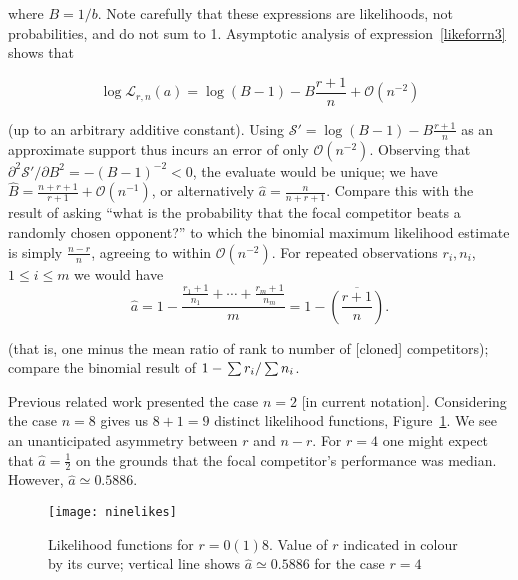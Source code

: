 \documentclass[article]{ajs}
\begin{document}
\noindent where $B=1/b$.  Note carefully that these expressions are
likelihoods, not probabilities, and do not sum to 1.  Asymptotic
analysis of expression~\ref{likeforrn3} shows that

\begin{equation}\label{asymptotic}
\log\mathcal{L}_{r,n}(a)=\log(B-1)-B\frac{r+1}{n}
+\mathcal{O}\left(n^{-2}\right)
\end{equation}

(up to an arbitrary additive constant).  Using
$\mathcal{S}'=\log(B-1)-B\frac{r+1}{n}$ as an approximate support thus
incurs an error of only $\mathcal{O}(n^{-2})$.  Observing that
$\partial^2\mathcal{S'}/\partial B^2=-(B-1)^{-2}<0$, the evaluate
would be unique; we have
$\hat{B}=\frac{n+r+1}{r+1}+\mathcal{O}\left(n^{-1}\right)$, or
alternatively $\hat{a}=\frac{n}{n+r+1}$.  Compare this with the result
of asking ``what is the probability that the focal competitor
beats a randomly chosen opponent?'' to which the binomial maximum
likelihood estimate is simply $\frac{n-r}{n}$, agreeing to within
$\mathcal{O}(n^{-2})$.  For repeated observations $r_i,n_i$,
$1\leqslant i\leqslant m$ we would have
\begin{equation}
  \hat{a} = 1-
  \frac{\frac{r_1+1}{n_1}+\cdots+\frac{r_m+1}{n_m}}{m}
  = 1-\overline{\left(\frac{r+1}{n}\right)}.
\end{equation}

(that is, one minus the mean ratio of rank to number of [cloned]
competitors); compare the binomial result of $1-\left.\sum
r_i\right/\sum n_i$.

Previous related work \citep{hankin2024_hyper3} presented the case
$n=2$ [in current notation].  Considering the case $n=8$ gives us
$8+1=9$ distinct likelihood functions, Figure~\ref{ninelikes}.  We see
an unanticipated asymmetry between $r$ and $n-r$.  For $r=4$ one might
expect that $\hat{a}=\frac{1}{2}$ on the grounds that the focal
competitor's performance was median.  However, $\hat{a}\simeq 0.5886$.

\begin{figure}[t]
  \begin{centering}
\texttt{[image: ninelikes]}  %
\caption{Likelihood functions for $r=0(1)8$\label{ninelikes}.  Value
  of $r$ indicated in colour by its curve; vertical line shows
  $\hat{a}\simeq 0.5886$ for the case $r=4$}
\end{centering}
\end{figure}
\end{document}
